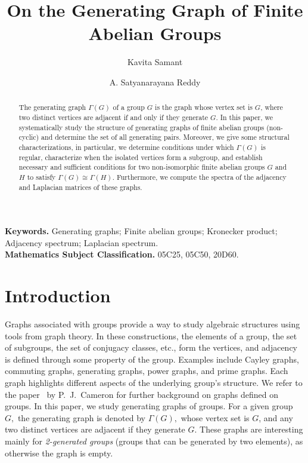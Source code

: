 \documentclass[11pt]{article}
\date{}
\title{On the Generating Graph of Finite Abelian Groups}
\author[1]{Kavita Samant}
\author[2]{A. Satyanarayana Reddy}
\affil[1,2]{{\normalsize Department of Mathematics\\Shiv Nadar Institution of Eminence, Delhi-NCR, India}\\ 
E-mail id(s): ks299@snu.edu.in; satya.a@snu.edu.in}
\date{}
\def \Ga {{\Gamma}}
\begin{document}
\maketitle
\begin{abstract}
    The generating graph $\Gamma(G)$ of a group $G$ is the graph whose vertex 
    set is $G$, where two distinct vertices are adjacent if and 
    only if they generate $G$. In this paper, we systematically study the 
    structure of generating graphs of finite abelian groups (non-cyclic)  and 
    determine the set of all generating pairs. Moreover, we give some structural characterizations, in particular, we determine conditions under which $\Gamma(G)$ is 
    regular, characterize when the isolated vertices form a subgroup, and 
    establish necessary and sufficient conditions for two non-isomorphic 
    finite abelian groups $G$ and $H$ to satisfy $\Gamma(G)\cong 
    \Gamma(H)$. Furthermore, 
    we compute the spectra of the adjacency and Laplacian matrices of these 
    graphs.
\end{abstract}
\textbf{Keywords.} Generating graphs; Finite abelian groups; Kronecker product; Adjacency spectrum; Laplacian spectrum.\\
\textbf{Mathematics Subject Classification.} 05C25, 05C50, 20D60.
  
\section{Introduction}

Graphs associated with groups provide a way to study algebraic structures using tools from graph theory. In these constructions, the elements of a group, the set of subgroups, the set of conjugacy classes, etc., form the vertices, and adjacency is defined through some property of the group. Examples include Cayley graphs, commuting graphs, generating graphs, power graphs, and prime graphs. Each graph highlights different aspects of the underlying group’s structure. We refer to the paper~\cite{cameron} by P.~J.~Cameron for further background on graphs defined on groups. In this paper, we study generating graphs of groups. For a given group $G,$ the generating graph is denoted by $\Ga(G),$ whose vertex set is $G$, and any two distinct vertices are adjacent if they generate $G$. These graphs are interesting mainly for \emph{2-generated groups} (groups that can be generated by two elements), as otherwise the graph is empty. 
\end{document}
